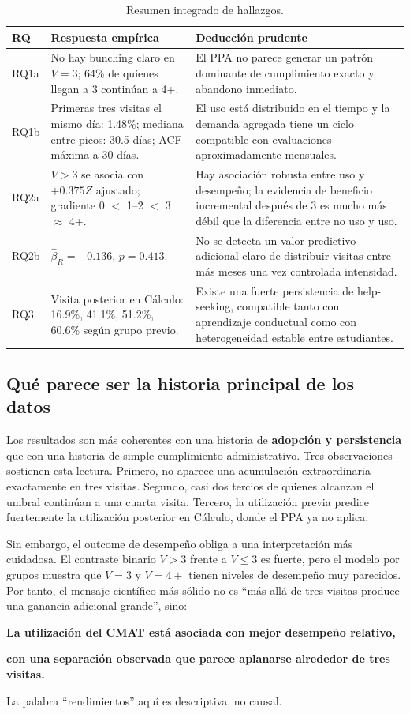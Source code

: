 \documentclass[11pt,letterpaper]{article}
\begin{document}
\begin{table}[H]
\centering
\caption{Resumen integrado de hallazgos.}
\label{tab:summary}
\begin{tabularx}{\textwidth}{@{}p{1.25cm}X X@{}}
\toprule
\textbf{RQ} & \textbf{Respuesta empírica} & \textbf{Deducción prudente} \\
\midrule
RQ1a & No hay bunching claro en $V=3$; 64\% de quienes llegan a 3 continúan a 4+. & El PPA no parece generar un patrón dominante de cumplimiento exacto y abandono inmediato. \\
RQ1b & Primeras tres visitas el mismo día: 1.48\%; mediana entre picos: 30.5 días; ACF máxima a 30 días. & El uso está distribuido en el tiempo y la demanda agregada tiene un ciclo compatible con evaluaciones aproximadamente mensuales. \\
RQ2a & $V>3$ se asocia con $+0.375Z$ ajustado; gradiente 0 $<$ 1--2 $<$ 3 $\approx$ 4+. & Hay asociación robusta entre uso y desempeño; la evidencia de beneficio incremental después de 3 es mucho más débil que la diferencia entre no uso y uso. \\
RQ2b & $\hat\beta_R=-0.136$, $p=0.413$. & No se detecta un valor predictivo adicional claro de distribuir visitas entre más meses una vez controlada intensidad. \\
RQ3 & Visita posterior en Cálculo: 16.9\%, 41.1\%, 51.2\%, 60.6\% según grupo previo. & Existe una fuerte persistencia de help-seeking, compatible tanto con aprendizaje conductual como con heterogeneidad estable entre estudiantes. \\
\bottomrule
\end{tabularx}
\end{table}

\subsection{Qué parece ser la historia principal de los datos}

Los resultados son más coherentes con una historia de \textbf{adopción y persistencia} que con una historia de simple cumplimiento administrativo. Tres observaciones sostienen esta lectura. Primero, no aparece una acumulación extraordinaria exactamente en tres visitas. Segundo, casi dos tercios de quienes alcanzan el umbral continúan a una cuarta visita. Tercero, la utilización previa predice fuertemente la utilización posterior en Cálculo, donde el PPA ya no aplica.

Sin embargo, el outcome de desempeño obliga a una interpretación más cuidadosa. El contraste binario $V>3$ frente a $V\leq3$ es fuerte, pero el modelo por grupos muestra que $V=3$ y $V=4+$ tienen niveles de desempeño muy parecidos. Por tanto, el mensaje científico más sólido no es ``más allá de tres visitas produce una ganancia adicional grande'', sino:
\begin{tcolorbox}[colback=cmatlight,colframe=cmatblue,boxrule=0.6pt]
\centering
\textbf{La utilización del CMAT está asociada con mejor desempeño relativo,}\par
\textbf{con una separación observada que parece aplanarse alrededor de tres visitas.}
\end{tcolorbox}
La palabra ``rendimientos'' aquí es descriptiva, no causal.
\end{document}
